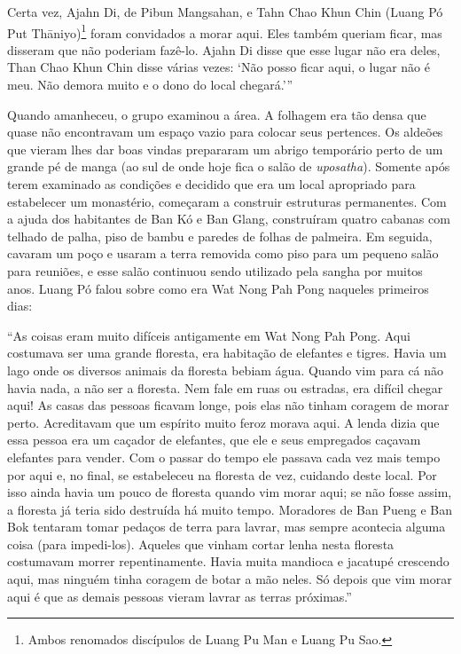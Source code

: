 Certa vez, Ajahn Di, de Pibun Mangsahan, e Tahn Chao Khun Chin (Luang Pó
Put Thāniyo)\footnote{Ambos renomados discípulos de Luang Pu Man e Luang
  Pu Sao.} foram convidados a morar aqui. Eles também queriam ficar, mas
disseram que não poderiam fazê-lo. Ajahn Di disse que esse lugar não era
deles, Than Chao Khun Chin disse várias vezes: `Não posso ficar aqui, o
lugar não é meu. Não demora muito e o dono do local chegará.'\thinspace ''

Quando amanheceu, o grupo examinou a área. A folhagem era tão densa que
quase não encontravam um espaço vazio para colocar seus pertences. Os
aldeões que vieram lhes dar boas vindas prepararam um abrigo temporário
perto de um grande pé de manga (ao sul de onde hoje fica o salão de
\emph{uposatha}). Somente após terem examinado as condições e decidido
que era um local apropriado para estabelecer um monastério, começaram a
construir estruturas permanentes. Com a ajuda dos habitantes de Ban Kó e
Ban Glang, construíram quatro cabanas com telhado de palha, piso de
bambu e paredes de folhas de palmeira. Em seguida, cavaram um poço e
usaram a terra removida como piso para um pequeno salão para reuniões, e
esse salão continuou sendo utilizado pela sangha por muitos anos. Luang
Pó falou sobre como era Wat Nong Pah Pong naqueles primeiros dias:

``As coisas eram muito difíceis antigamente em Wat Nong Pah Pong. Aqui
costumava ser uma grande floresta, era habitação de elefantes e tigres.
Havia um lago onde os diversos animais da floresta bebiam água. Quando
vim para cá não havia nada, a não ser a floresta. Nem fale em ruas ou
estradas, era difícil chegar aqui! As casas das pessoas ficavam longe,
pois elas não tinham coragem de morar perto. Acreditavam que um espírito
muito feroz morava aqui. A lenda dizia que essa pessoa era um caçador de
elefantes, que ele e seus empregados caçavam elefantes para vender. Com
o passar do tempo ele passava cada vez mais tempo por aqui e, no final,
se estabeleceu na floresta de vez, cuidando deste local. Por isso ainda
havia um pouco de floresta quando vim morar aqui; se não fosse assim, a
floresta já teria sido destruída há muito tempo. Moradores de Ban Pueng
e Ban Bok tentaram tomar pedaços de terra para lavrar, mas sempre
acontecia alguma coisa (para impedi-los). Aqueles que vinham cortar
lenha nesta floresta costumavam morrer repentinamente. Havia muita
mandioca e jacatupé crescendo aqui, mas ninguém tinha coragem de botar a
mão neles. Só depois que vim morar aqui é que as demais pessoas vieram
lavrar as terras próximas.''

